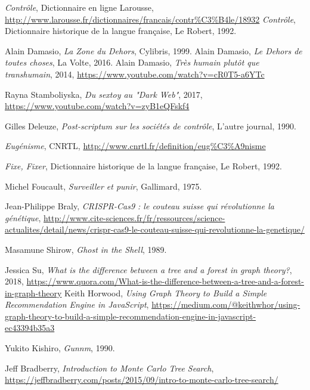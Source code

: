 \begin{thebibliography}{99}
     \emph{Contrôle}, Dictionnaire en ligne Larousse, \url{http://www.larousse.fr/dictionnaires/francais/contr%C3%B4le/18932}
     \emph{Contrôle}, Dictionnaire historique de la langue française, Le Robert, 1992.

     Alain Damasio, \emph{La Zone du Dehors}, Cylibris, 1999.
     Alain Damasio, \emph{Le Dehors de toutes choses}, La Volte, 2016.
     Alain Damasio, \emph{Très humain plutôt que transhumain}, 2014, \url{https://www.youtube.com/watch?v=cR0T5-a6YTc}

     Rayna Stamboliyska, \emph{Du sextoy au "Dark Web"}, 2017, \url{https://www.youtube.com/watch?v=zyB1eQFskf4}

     Gilles Deleuze, \emph{Post-scriptum sur les sociétés de contrôle}, L'autre journal, 1990.

     \emph{Eugénisme}, CNRTL, \url{http://www.cnrtl.fr/definition/eug%C3%A9nisme}

     \emph{Fixe, Fixer}, Dictionnaire historique de la langue française, Le Robert, 1992. 

     Michel Foucault, \emph{Surveiller et punir}, Gallimard, 1975.

     Jean-Philippe Braly, \emph{CRISPR-Cas9 : le couteau suisse qui révolutionne la génétique}, \url{http://www.cite-sciences.fr/fr/ressources/science-actualites/detail/news/crispr-cas9-le-couteau-suisse-qui-revolutionne-la-genetique/}

     Masamune Shirow, \emph{Ghost in the Shell}, 1989.

     Jessica Su, \emph{What is the difference between a tree and a forest in graph theory?}, 2018, \url{https://www.quora.com/What-is-the-difference-between-a-tree-and-a-forest-in-graph-theory}
     Keith Horwood, \emph{Using Graph Theory to Build a Simple Recommendation Engine in JavaScript}, \url{https://medium.com/@keithwhor/using-graph-theory-to-build-a-simple-recommendation-engine-in-javascript-ec43394b35a3}

     Yukito Kishiro, \emph{Gunnm}, 1990.

     Jeff Bradberry, \emph{Introduction to Monte Carlo Tree Search}, \url{https://jeffbradberry.com/posts/2015/09/intro-to-monte-carlo-tree-search/}


\end{thebibliography}
